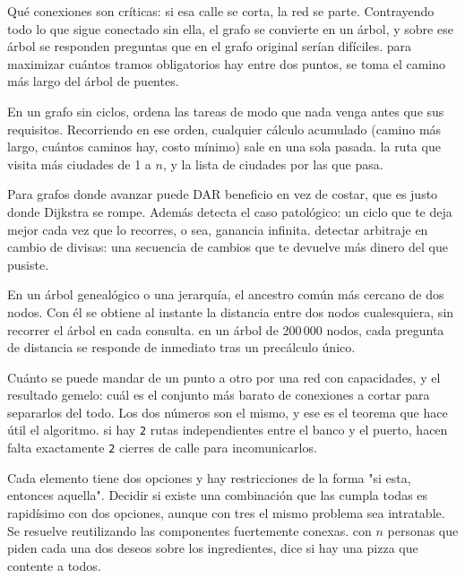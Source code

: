 Qué conexiones son críticas: si esa calle se corta, la red se parte. Contrayendo
todo lo que sigue conectado sin ella, el grafo se convierte en un árbol, y sobre
ese árbol se responden preguntas que en el grafo original serían difíciles.
\ej para maximizar cuántos tramos obligatorios hay entre dos puntos, se toma el
camino más largo del árbol de puentes.

En un grafo sin ciclos, ordena las tareas de modo que nada venga antes que sus
requisitos. Recorriendo en ese orden, cualquier cálculo acumulado (camino más
largo, cuántos caminos hay, costo mínimo) sale en una sola pasada.
\ej la ruta que visita más ciudades de 1 a $n$, y la lista de ciudades por las que
pasa.

Para grafos donde avanzar puede DAR beneficio en vez de costar, que es justo donde
Dijkstra se rompe. Además detecta el caso patológico: un ciclo que te deja mejor
cada vez que lo recorres, o sea, ganancia infinita.
\ej detectar arbitraje en cambio de divisas: una secuencia de cambios que te
devuelve más dinero del que pusiste.

En un árbol genealógico o una jerarquía, el ancestro común más cercano de dos
nodos. Con él se obtiene al instante la distancia entre dos nodos cualesquiera, sin
recorrer el árbol en cada consulta.
\ej en un árbol de 200\,000 nodos, cada pregunta de distancia se responde de
inmediato tras un precálculo único.

Cuánto se puede mandar de un punto a otro por una red con capacidades, y el
resultado gemelo: cuál es el conjunto más barato de conexiones a cortar para
separarlos del todo. Los dos números son el mismo, y ese es el teorema que hace
útil el algoritmo.
\ej si hay \texttt{2} rutas independientes entre el banco y el puerto, hacen falta
exactamente \texttt{2} cierres de calle para incomunicarlos.

Cada elemento tiene dos opciones y hay restricciones de la forma "si esta, entonces
aquella". Decidir si existe una combinación que las cumpla todas es rapidísimo con
dos opciones, aunque con tres el mismo problema sea intratable. Se resuelve
reutilizando las componentes fuertemente conexas.
\ej con $n$ personas que piden cada una dos deseos sobre los ingredientes, dice si
hay una pizza que contente a todos.

